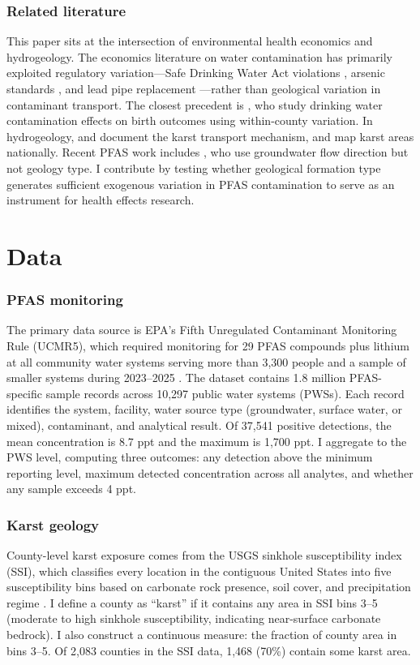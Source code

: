 \documentclass[12pt]{article}
\begin{document}
\subsubsection*{Related literature} This paper sits at the intersection of environmental health economics and hydrogeology. The economics literature on water contamination has primarily exploited regulatory variation---Safe Drinking Water Act violations \citep{allaire2018national}, arsenic standards \citep{bennear2006drinking}, and lead pipe replacement \citep{gazze2021impact}---rather than geological variation in contaminant transport. The closest precedent is \citet{currie2013does}, who study drinking water contamination effects on birth outcomes using within-county variation. In hydrogeology, \citet{goldscheider2007karst} and \citet{ford2007karst} document the karst transport mechanism, and \citet{weary2014karst} map karst areas nationally. Recent PFAS work includes \citet{cookson2025pfas}, who use groundwater flow direction but not geology type. I contribute by testing whether geological formation type generates sufficient exogenous variation in PFAS contamination to serve as an instrument for health effects research.

\section{Data}

\subsubsection*{PFAS monitoring} The primary data source is EPA's Fifth Unregulated Contaminant Monitoring Rule (UCMR5), which required monitoring for 29 PFAS compounds plus lithium at all community water systems serving more than 3,300 people and a sample of smaller systems during 2023--2025 \citep{epa2023ucmr5}. The dataset contains 1.8 million PFAS-specific sample records across 10,297 public water systems (PWSs). Each record identifies the system, facility, water source type (groundwater, surface water, or mixed), contaminant, and analytical result. Of 37,541 positive detections, the mean concentration is 8.7 ppt and the maximum is 1,700 ppt. I aggregate to the PWS level, computing three outcomes: any detection above the minimum reporting level, maximum detected concentration across all analytes, and whether any sample exceeds 4 ppt.

\subsubsection*{Karst geology} County-level karst exposure comes from the USGS sinkhole susceptibility index (SSI), which classifies every location in the contiguous United States into five susceptibility bins based on carbonate rock presence, soil cover, and precipitation regime \citep{weary2023sinkhole}. I define a county as ``karst'' if it contains any area in SSI bins 3--5 (moderate to high sinkhole susceptibility, indicating near-surface carbonate bedrock). I also construct a continuous measure: the fraction of county area in bins 3--5. Of 2,083 counties in the SSI data, 1,468 (70\%) contain some karst area.
\end{document}
